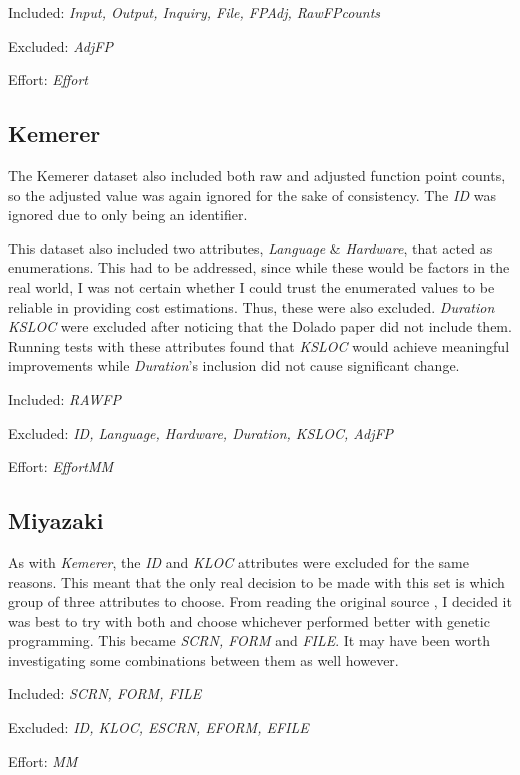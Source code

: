 \documentclass[11pt, a4paper]{article}
\begin{document}
Included: \emph{Input, Output, Inquiry, File, FPAdj, RawFPcounts}

Excluded: \emph{AdjFP}

Effort: \emph{Effort}

\subsection{Kemerer} %
\label{sub:kemerer}
The Kemerer dataset also included both raw and adjusted function point counts,
so the adjusted value was again ignored for the sake of consistency. The
\emph{ID} was ignored due to only being an identifier.

This dataset also included two attributes, \emph{Language} \& \emph{Hardware},
that acted as enumerations. This had to be addressed, since while these would be
factors in the real world, I was not certain whether I could trust the
enumerated values to be reliable in providing cost estimations. Thus, these were
also excluded. \emph{Duration} \emph{KSLOC} were excluded after noticing that
the Dolado paper did not include them. Running tests with these attributes found
that \emph{KSLOC} would achieve meaningful improvements while \emph{Duration}'s
inclusion did not cause significant change.

Included: \emph{RAWFP}

Excluded: \emph{ID, Language, Hardware, Duration, KSLOC, AdjFP}

Effort: \emph{EffortMM}

\subsection{Miyazaki} %
\label{sub:miyazaki}
As with \emph{Kemerer}, the \emph{ID} and \emph{KLOC} attributes were excluded
for the same reasons. This meant that the only real decision to be made with
this set is which group of three attributes to choose. From reading the original
source \cite[Section~4.2]{MIYAZAKI19943}, I decided it was best to try with both
and choose whichever performed better with genetic programming. This became
\emph{SCRN, FORM} and \emph{FILE}. It may have been worth investigating some
combinations between them as well however.

Included: \emph{SCRN, FORM, FILE}

Excluded: \emph{ID, KLOC, ESCRN, EFORM, EFILE}

Effort: \emph{MM}
\end{document}
